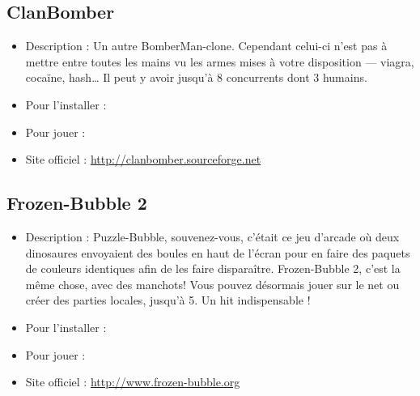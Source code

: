 \subsection{ClanBomber}
\begin{itemize}
\begingroup
{}
\item Description : Un autre BomberMan-clone. Cependant celui-ci n'est pas à mettre entre toutes les mains vu les armes mises à votre disposition --- viagra, cocaïne, hash\ldots{} Il peut y avoir jusqu'à 8 concurrents dont 3 humains.{\par}
\item Pour l'installer : 
\item Pour jouer : 
\item Site officiel : \url{http://clanbomber.sourceforge.net}{\par}
\endgroup
\end{itemize}
\subsection{Frozen-Bubble 2}
\begin{itemize}
\begingroup
{}
\item Description : Puzzle-Bubble, souvenez-vous, c'était ce jeu d'arcade où deux dinosaures envoyaient des boules en haut de l'écran pour en faire des paquets de couleurs identiques afin de les faire disparaître. Frozen-Bubble 2, c'est la même chose, avec des manchots!  Vous pouvez désormais jouer sur le net ou créer des parties locales, jusqu'à 5. Un hit indispensable !{\par}
\endgroup
\item Pour l'installer : 
\item Pour jouer : 
\item Site officiel : \url{http://www.frozen-bubble.org}{\par}
\end{itemize}
